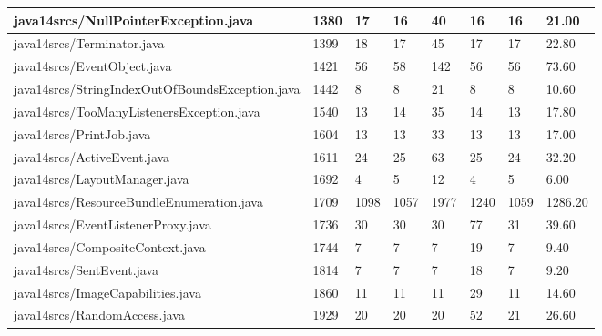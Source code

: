 \begin{tabular}{|l|l|l|l|l|l|l|l|}
\hline
java14srcs/NullPointerException.java               & 1380        & 17        & 16        & 40        & 16        & 16        & 21.00     \\
\hline
java14srcs/Terminator.java                         & 1399        & 18        & 17        & 45        & 17        & 17        & 22.80     \\
\hline
java14srcs/EventObject.java                        & 1421        & 56        & 58        & 142       & 56        & 56        & 73.60     \\
\hline
java14srcs/StringIndexOutOfBoundsException.java    & 1442        & 8         & 8         & 21        & 8         & 8         & 10.60     \\
\hline
java14srcs/TooManyListenersException.java          & 1540        & 13        & 14        & 35        & 14        & 13        & 17.80     \\
\hline
java14srcs/PrintJob.java                           & 1604        & 13        & 13        & 33        & 13        & 13        & 17.00     \\
\hline
java14srcs/ActiveEvent.java                        & 1611        & 24        & 25        & 63        & 25        & 24        & 32.20     \\
\hline
java14srcs/LayoutManager.java                      & 1692        & 4         & 5         & 12        & 4         & 5         & 6.00      \\
\hline
java14srcs/ResourceBundleEnumeration.java          & 1709        & 1098      & 1057      & 1977      & 1240      & 1059      & 1286.20   \\
\hline
java14srcs/EventListenerProxy.java                 & 1736        & 30        & 30        & 30        & 77        & 31        & 39.60     \\
\hline
java14srcs/CompositeContext.java                   & 1744        & 7         & 7         & 7         & 19        & 7         & 9.40      \\
\hline
java14srcs/SentEvent.java                          & 1814        & 7         & 7         & 7         & 18        & 7         & 9.20      \\
\hline
java14srcs/ImageCapabilities.java                  & 1860        & 11        & 11        & 11        & 29        & 11        & 14.60     \\
\hline
java14srcs/RandomAccess.java                       & 1929        & 20        & 20        & 20        & 52        & 21        & 26.60     \\

\end{tabular}
